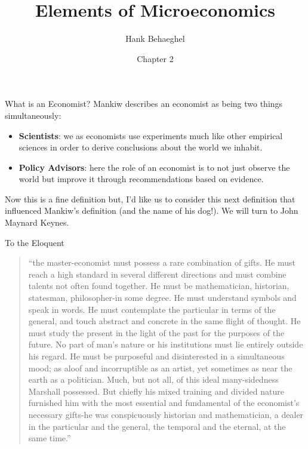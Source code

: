 \documentclass[aspectratio=169]{beamer}
\title{Elements of Microeconomics}
\author{Hank Behaeghel}
\institute{Johns Hopkins University}
\date{Chapter 2}
\begin{document}
\maketitle

\begin{frame}{What is an Economist?}
    Mankiw describes an economist as being two things simultaneously:
    \vspace{10pt}
    \begin{itemize}[label = $\bullet$, itemsep = 10pt]
        \item \textbf{Scientists}: we as economists use experiments much like other empirical sciences in order to derive conclusions about the world we inhabit.
        \item \textbf{Policy Advisors}: here the role of an economist is to not just observe the world but improve it through recommendations based on evidence. 
    \end{itemize}
    \vspace{10pt}
    Now this is a fine definition but, I'd like us to consider this next definition that influenced Mankiw's definition (and the name of his dog!). We will turn to John Maynard Keynes.
\end{frame}

\begin{frame}{To the Eloquent}

\begin{quote}
    \enquote{the master-economist must possess a rare combination of gifts. 
    He must reach a high standard in several
    different directions and must combine talents not often found
    together. He must be mathematician, historian, statesman,
    philosopher-in some degree. He must understand symbols
    and speak in words. He must contemplate the particular in
    terms of the general, and touch abstract and concrete in the same
    flight of thought. He must study the present in the light of
    the past for the purposes of the future. No part of man's nature
    or his institutions must lie entirely outside his regard. He must
    be purposeful and disinterested in a simultaneous mood; as
    aloof and incorruptible as an artist, yet sometimes as near the earth
    as a politician. Much, but not all, of this ideal many-sidedness
    Marshall possessed. But chiefly his mixed training and divided
    nature furnished him with the most essential and fundamental
    of the economist's necessary gifts-he was conspicuously historian
    and mathematician, a dealer in the particular and the general,
    the temporal and the eternal, at the same time.}
\end{quote}

\end{frame}
\end{document}
